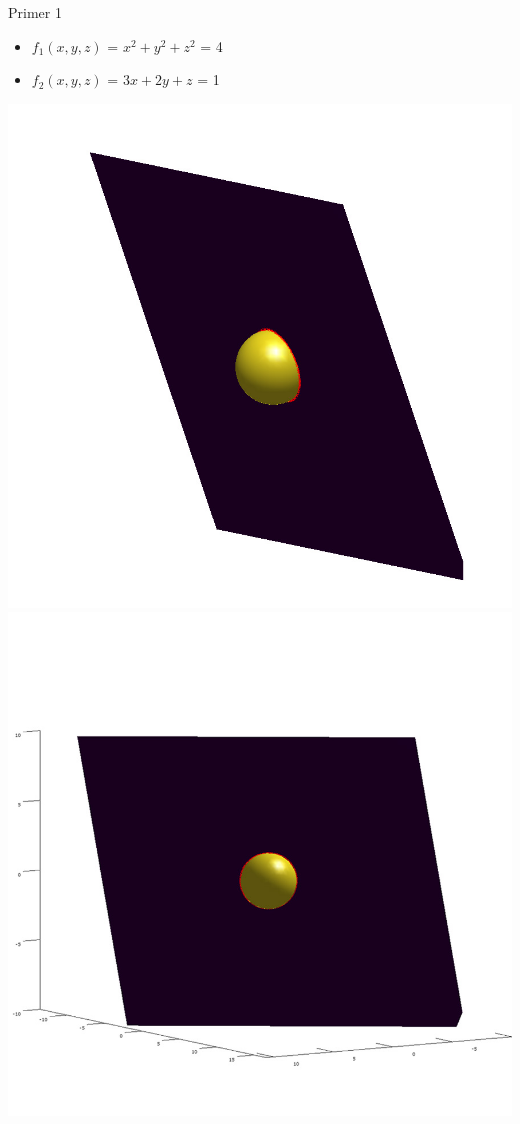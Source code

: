 \documentclass{beamer}
\begin{document}
\begin{frame}{Primer 1}
	\begin{itemize} 
		\item $f_{1}(x,y,z)$ = $x^2 + y^2 + z^2$ = 4
		\item $f_{2}(x,y,z)$ = $3x + 2y + z$ = 1	
	\end{itemize} 
	\includegraphics[scale=0.3]{primer1_1}
	\includegraphics[scale=0.3]{primer1_2}
\end{frame}
\end{document}
